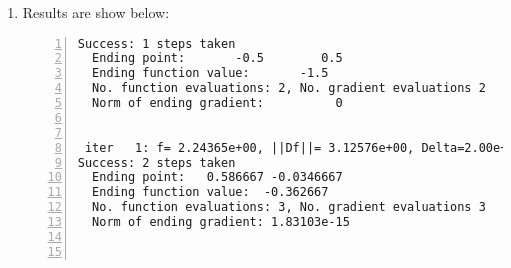 \documentclass[12pt]{article}
\begin{document}
\begin{enumerate}
\begin{lstlisting}[language={[ANSI]C}, numbers=left, numberstyle=\tiny, frame=shadowbox, basicstyle=\ttfamily\small, showspaces=false, breaklines=true, showstringspaces=false, showtabs=false]
    if rho_cur > trparams.eta
        x.p = x.p + p_neo;
        x.f = next_f;
        x.g = feval(fun, x.p, 2);
       %% check if stopping criteria meets
        if norm(x.g) <= trparams.toler
            inform.status = 1;
            return
        end
        x.h = feval(fun, x.p, 4);
        [v,d] = eig(x.h);
        for i = 1 : size(d,1)
            d(i,i) = max(d(i,i),trparams.delta);
        end
        x.h = v' * d * v;
    end
    fprintf(1, ' iter %3d: f=%12.5e, ||Df||=%12.5e, Delta=%7.2e\n', inform.iter, x.f, norm(x.g), delta_cur);


end

inform.status = 0;
inform.iter = trparams.maxit;

return;
\end{lstlisting}

\clearpage


\item

Results are show below:

\begin{lstlisting}[language={[ANSI]C}, numbers=left, numberstyle=\tiny, frame=shadowbox, basicstyle=\ttfamily\small, showspaces=false, breaklines=true, showstringspaces=false, showtabs=false]
Success: 1 steps taken
  Ending point:       -0.5        0.5
  Ending function value:       -1.5
  No. function evaluations: 2, No. gradient evaluations 2
  Norm of ending gradient:          0


 iter   1: f= 2.24365e+00, ||Df||= 3.12576e+00, Delta=2.00e+00
Success: 2 steps taken
  Ending point:   0.586667 -0.0346667
  Ending function value:  -0.362667
  No. function evaluations: 3, No. gradient evaluations 3
  Norm of ending gradient: 1.83103e-15



\end{lstlisting}
\end{enumerate}
\end{document}
